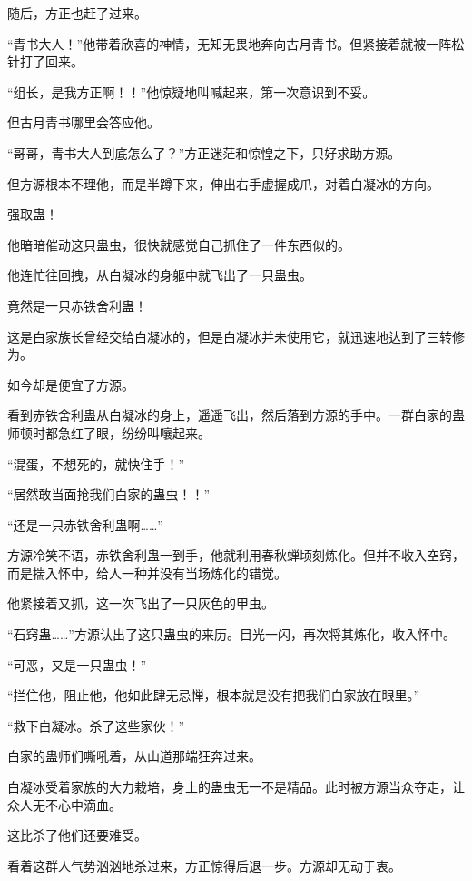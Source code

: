 
\begin{this_body}



随后，方正也赶了过来。

“青书大人！”他带着欣喜的神情，无知无畏地奔向古月青书。但紧接着就被一阵松针打了回来。

“组长，是我方正啊！！”他惊疑地叫喊起来，第一次意识到不妥。

但古月青书哪里会答应他。

“哥哥，青书大人到底怎么了？”方正迷茫和惊惶之下，只好求助方源。

但方源根本不理他，而是半蹲下来，伸出右手虚握成爪，对着白凝冰的方向。

强取蛊！

他暗暗催动这只蛊虫，很快就感觉自己抓住了一件东西似的。

他连忙往回拽，从白凝冰的身躯中就飞出了一只蛊虫。

竟然是一只赤铁舍利蛊！

这是白家族长曾经交给白凝冰的，但是白凝冰并未使用它，就迅速地达到了三转修为。

如今却是便宜了方源。

看到赤铁舍利蛊从白凝冰的身上，遥遥飞出，然后落到方源的手中。一群白家的蛊师顿时都急红了眼，纷纷叫嚷起来。

“混蛋，不想死的，就快住手！”

“居然敢当面抢我们白家的蛊虫！！”

“还是一只赤铁舍利蛊啊……”

方源冷笑不语，赤铁舍利蛊一到手，他就利用春秋蝉顷刻炼化。但并不收入空窍，而是揣入怀中，给人一种并没有当场炼化的错觉。

他紧接着又抓，这一次飞出了一只灰色的甲虫。

“石窍蛊……”方源认出了这只蛊虫的来历。目光一闪，再次将其炼化，收入怀中。

“可恶，又是一只蛊虫！”

“拦住他，阻止他，他如此肆无忌惮，根本就是没有把我们白家放在眼里。”

“救下白凝冰。杀了这些家伙！”

白家的蛊师们嘶吼着，从山道那端狂奔过来。

白凝冰受着家族的大力栽培，身上的蛊虫无一不是精品。此时被方源当众夺走，让众人无不心中滴血。

这比杀了他们还要难受。

看着这群人气势汹汹地杀过来，方正惊得后退一步。方源却无动于衷。


\end{this_body}

